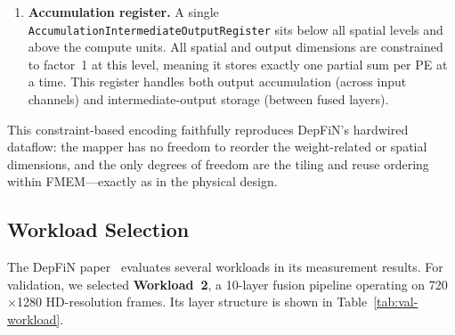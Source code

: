 \begin{enumerate}
  \item \textbf{Accumulation register.}
        A single \texttt{AccumulationIntermediateOutputRegister}
        sits below all spatial levels and above the compute units.
        All spatial and output dimensions are constrained to factor~1
        at this level, meaning it stores exactly one partial sum per
        PE at a time.
        This register handles both output accumulation (across input
        channels) and intermediate-output storage (between fused
        layers).
\end{enumerate}

This constraint-based encoding faithfully reproduces DepFiN's
hardwired dataflow: the mapper has no freedom to reorder the
weight-related or spatial dimensions, and the only degrees of freedom
are the tiling and reuse ordering within FMEM---exactly as in the
physical design.


\subsection{Workload Selection}
\label{sec:val-workload}

The DepFiN paper~\cite{goetschalckx2023depfin} evaluates several
workloads in its measurement results.
For validation, we selected \textbf{Workload~2}, a 10-layer fusion
pipeline operating on 720$\times$1280 HD-resolution
frames.
Its layer structure is shown in Table~\ref{tab:val-workload}.

